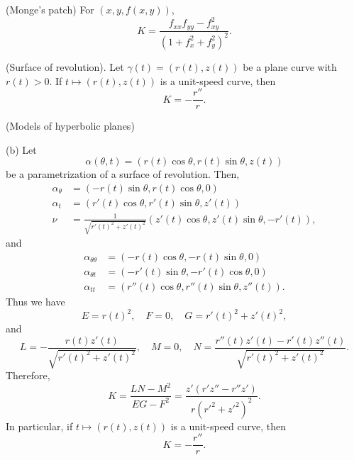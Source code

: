 \documentclass{../../large}
\renewcommand{\a}{\alpha}
\begin{document}
\begin{prb}
\begin{parts}
\item
(Monge's patch)
For $(x,y,f(x,y))$,
\[K=\frac{f_{xx}f_{yy}-f_{xy}^2}{(1+f_x^2+f_y^2)^2}.\]

\item
(Surface of revolution).
Let $\gamma(t)=(r(t),z(t))$ be a plane curve with $r(t)>0$.
If $t\mapsto(r(t),z(t))$ is a unit-speed curve, then
\[K=-\frac{r''}r.\]

\item
(Models of hyperbolic planes)
\end{parts}
\end{prb}
\begin{pf}
(b)
Let
\[\a(\theta,t)=(r(t)\cos\theta,r(t)\sin\theta,z(t))\]
be a parametrization of a surface of revolution.
Then,
\begin{align*}
\a_\theta&=(-r(t)\sin\theta,r(t)\cos\theta,0)\\
\a_t&=(r'(t)\cos\theta,r'(t)\sin\theta,z'(t))\\
\nu&=\frac1{\sqrt{r'(t)^2+z'(t)^2}}(z'(t)\cos\theta,z'(t)\sin\theta,-r'(t)),
\end{align*}
and
\begin{align*}
\a_{\theta\theta}&=(-r(t)\cos\theta,-r(t)\sin\theta,0)\\
\a_{\theta t}&=(-r'(t)\sin\theta,-r'(t)\cos\theta,0)\\
\a_{tt}&=(r''(t)\cos\theta,r''(t)\sin\theta,z''(t)).
\end{align*}
Thus we have
\[E=r(t)^2,\quad F=0,\quad G=r'(t)^2+z'(t)^2,\]
and
\[L=-\frac{r(t)z'(t)}{\sqrt{r'(t)^2+z'(t)^2}},\quad M=0,\quad N=\frac{r''(t)z'(t)-r'(t)z''(t)}{\sqrt{r'(t)^2+z'(t)^2}}.\]
Therefore,
\[K=\frac{LN-M^2}{EG-F^2}=\frac{z'(r'z''-r''z')}{r(r'^2+z'^2)^2}.\]
In particular, if $t\mapsto(r(t),z(t))$ is a unit-speed curve, then
\[K=-\frac{r''}r.\]
\end{pf}



\end{document}
